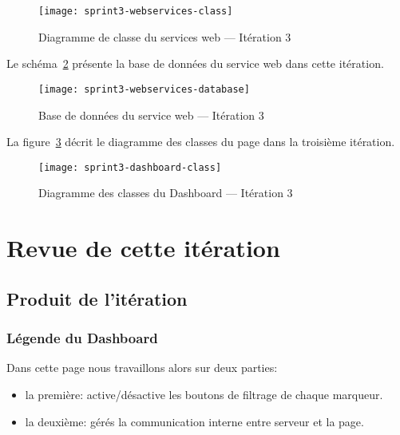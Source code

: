 \begin{figure}[H]
    \centering
    \texttt{[image: sprint3-webservices-class]}
    \caption{Diagramme de classe du services web --- Itération 3}
\label{fig:sprint3-webservices-class}
\end{figure}

Le schéma~\ref{fig:sprint3-webservices-database} présente la base de données
du service web dans cette itération.

\begin{figure}[H]
    \centering
    \texttt{[image: sprint3-webservices-database]}
    \caption{Base de données du service web --- Itération 3}
\label{fig:sprint3-webservices-database}
\end{figure}

La figure~\ref{fig:sprint3-dashboard-classs} décrit le diagramme des classes du
page  dans la troisième itération.

\begin{figure}[H]
    \centering
    \texttt{[image: sprint3-dashboard-class]}
    \caption{Diagramme des classes du Dashboard --- Itération 3}
\label{fig:sprint3-dashboard-classs}
\end{figure}

\section{Revue de cette itération}


\subsection{Produit de l'itération}

\subsubsection{Légende du Dashboard}
Dans cette page nous travaillons alors sur deux parties:

\begin{itemize}
    \item la première: active/désactive les boutons de filtrage de chaque
        marqueur.
    \item la deuxième: gérés la communication interne entre serveur et la page.
\end{itemize}

